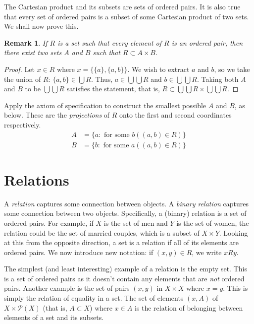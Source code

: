 \documentclass[12pt]{article}
\newtheorem{remark}{Remark}
\begin{document}
The Cartesian product and its subsets are sets of ordered pairs. It is also true that every set of
ordered pairs is a subset of some Cartesian product of two sets. We shall now prove this.
\begin{remark}
    If $R$ is a set such that every element of $R$ is an ordered pair, then there exist two sets $A$
    and $B$ such that $R \subset A \times B$.
\end{remark}
\begin{proof}
    Let $x \in R$ where $x = \{\{a\}, \{a, b\}\}$. We wish to extract $a$ and $b$, so we take the union
    of $R$: $\{a, b\} \in \bigcup R$. Thus, $a \in \bigcup \bigcup R$ and $b \in \bigcup \bigcup R$.
    Taking both $A$ and $B$ to be $\bigcup \bigcup R$ satisfies the statement, that is, $R \subset
    \bigcup \bigcup R \times \bigcup \bigcup R$.
\end{proof}
Apply the axiom of specification to construct the smallest possible $A$ and $B$, as below. These are
the \textit{projections} of $R$ onto the first and second coordinates respectively.
\begin{align*}
    A &= \{a: \text{ for some } b ((a, b) \in R)\}\\
    B &= \{b: \text{ for some } a ((a, b) \in R)\}
\end{align*}

\section{Relations}
A \textit{relation} captures some connection between objects. A \textit{binary relation} captures some
connection between two objects. Specifically, a (binary) relation is a set of ordered pairs. For example,
if $X$ is the set of men and $Y$ is the set of women, the relation could be the set of married couples,
which is a subset of $X \times Y$. Looking at this from the opposite direction, a set is a relation if
all of its elements are ordered pairs. We now introduce new notation: if $(x, y) \in R$, we write $x R y$.

The simplest (and least interesting) example of a relation is the empty set. This is a set of ordered pairs
as it doesn't contain any elements that are \textit{not} ordered pairs. Another example is the set of pairs $(x, y)$
in $X \times X$ where $x = y$. This is simply the relation of equality in a set. The set of elements $(x, A)$ of $X \times \mathcal{P}(X)$ (that is,
$A \subset X$) where $x \in A$ is the relation of belonging between elements of a set and its subsets.
\end{document}
